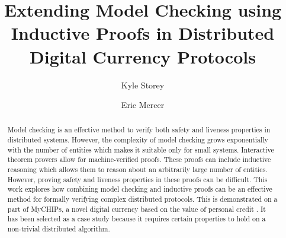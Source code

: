 \documentclass[runningheads]{llncs}
\begin{document}
\title{Extending Model Checking using Inductive Proofs in Distributed Digital Currency Protocols}

\author{Kyle Storey \and Eric Mercer}

\maketitle

\begin{abstract}

Model checking is an effective method to verify both safety and liveness properties in distributed systems. However, the complexity of model checking grows exponentially with the number of entities which makes it suitable only for small systems.
Interactive theorem provers allow for machine-verified proofs. These proofs can include inductive reasoning which allows them to reason about an arbitrarily large number of entities. However, proving safety and liveness properties in these proofs can be difficult.
This work explores how combining model checking and inductive proofs can be an effective method for formally verifying complex distributed protocols. This is demonstrated on a part of MyCHIPs, a novel digital currency based on the value of personal credit \cite{bateman_myCHIPs}. It has been selected as a case study because it requires certain properties to hold on a non-trivial distributed algorithm. 


\end{abstract}

\end{document}

